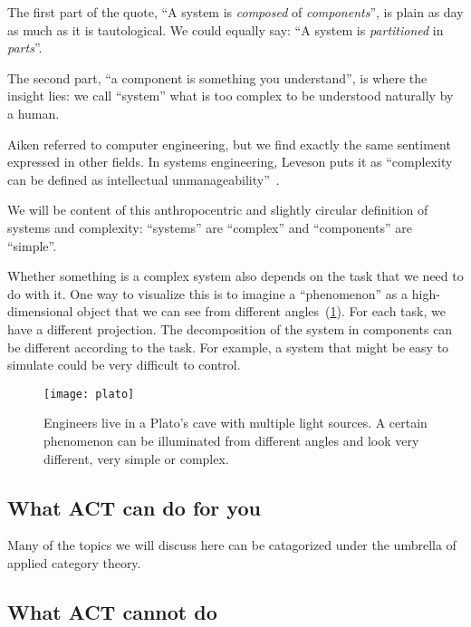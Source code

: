 The first part of the quote, ``A system is \emph{composed} of \emph{components}'', is plain as day as much as it is tautological.
We could equally say: ``A system is \emph{partitioned} in \emph{parts}''.

The second part, ``a component is something you understand'', is where the insight lies: we call ``system'' what is too complex to be understood naturally by a human.

Aiken referred to computer engineering, but we find exactly the same sentiment expressed in other fields.
In systems engineering, Leveson puts it as ``complexity can be defined as intellectual unmanageability''~\cite{leveson12engineering}.

We will be content of this anthropocentric and slightly circular definition of systems and complexity: ``systems'' are ``complex'' and ``components'' are ``simple''.

Whether something is a complex system also depends on the task that we need to do with it.
One way to visualize this is to imagine a ``phenomenon'' as a high-dimensional object that we can see from different angles~(\cref{fig:aspects}).
For each task, we have a different projection.
The decomposition of the system in components can be different according to the task.
For example, a system that might be easy to simulate could be very difficult to control.

\begin{figure}[h]
    \centering
    \texttt{[image: plato]}
    \caption{
        Engineers live in a Plato's cave with multiple light sources.
        A certain phenomenon can be illuminated from different angles and look very different, very simple or complex.
    }
    \label{fig:aspects}
\end{figure}


\subsection{What ACT can do for you}

Many of the topics we will discuss here can be catagorized under the umbrella of applied category theory.


\subsection{What ACT cannot do}

